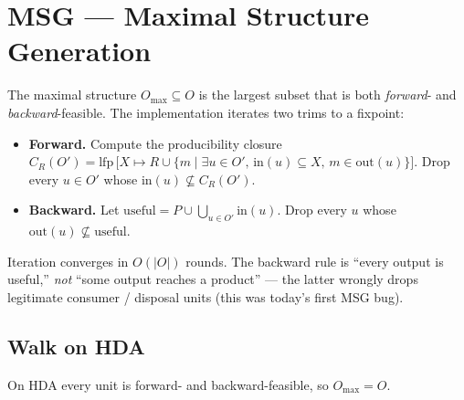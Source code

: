 \documentclass[11pt,a4paper]{article}
\begin{document}
\section{MSG --- Maximal Structure Generation}

The maximal structure $O_{\max}\subseteq O$ is the largest subset
that is both \emph{forward}- and \emph{backward}-feasible. The
implementation iterates two trims to a fixpoint:

\begin{itemize}
\item \textbf{Forward.} Compute the producibility closure
  $C_R(O') = \mathrm{lfp}\,\big[X \mapsto R \cup \{m \mid \exists u
  \in O',\, \mathrm{in}(u) \subseteq X,\, m \in \mathrm{out}(u)\}\big]$.
  Drop every $u\in O'$ whose $\mathrm{in}(u) \not\subseteq C_R(O')$.
\item \textbf{Backward.} Let
  $\mathrm{useful} = P \cup \bigcup_{u\in O'} \mathrm{in}(u)$. Drop
  every $u$ whose $\mathrm{out}(u) \not\subseteq \mathrm{useful}$.
\end{itemize}

Iteration converges in $O(|O|)$ rounds. The backward rule is
``every output is useful,'' \emph{not} ``some output reaches a
product'' --- the latter wrongly drops legitimate consumer / disposal
units (this was today's first MSG bug).

\subsection*{Walk on HDA}

\begin{center}
\end{center}
On HDA every unit is forward- and backward-feasible, so $O_{\max}=O$.
\end{document}
